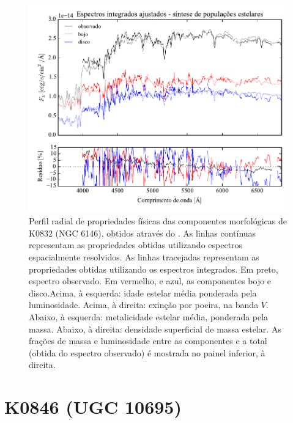 \begin{figure}
	\includegraphics[page=10]{figuras/sample006a_synthesis}
	\caption[Propriedades físicas das componentes morfológicas de K0832 (NGC 6146)]
	{Perfil radial de propriedades físicas das componentes morfológicas de
	K0832 (NGC 6146), obtidos através do \starlight. As linhas contínuas
	representam as propriedades obtidas utilizando espectros espacialmente
	resolvidos. As linhas tracejadas representam as propriedades obtidas utilizando
	os espectros integrados. Em preto, espectro observado. Em vermelho, e azul, as
	componentes bojo e disco.Acima, à esquerda: idade estelar média ponderada pela
	luminosidade. Acima, à direita: exinção por poeira, na banda $V$. Abaixo, à
	esquerda: metalicidade estelar média, ponderada pela massa. Abaixo, à direita:
	densidade superficial de massa estelar. As frações de massa e luminosidade
	entre as componentes e a total (obtida do espectro observado) é mostrada no
	painel inferior, à direita.}
	\label{fig:decompSinteseRadprof:K0832}
\end{figure}


\section{K0846 (UGC 10695)}
\label{apendice:Decomp:K0846}

